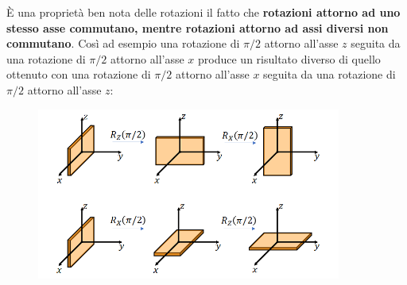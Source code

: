 \documentclass[a4paper,12pt,oneside]{book}
\begin{document}
È una proprietà ben nota delle rotazioni il fatto che \textbf{rotazioni attorno ad uno stesso asse commutano, mentre rotazioni attorno ad assi diversi non commutano}. Così ad esempio una rotazione di $\pi /2$ attorno all'asse $z$ seguita da una rotazione di $\pi /2$ attorno all'asse $x$ produce un risultato diverso di quello ottenuto con una rotazione di $\pi /2$ attorno all'asse $x$ seguita da una rotazione di $\pi /2$ attorno all'asse $z$:\\
\begin{figure}[!htbp]
\begin{center}
\includegraphics[width=10cm]{immagini/cap_16/fig_16_1.png}
\end{center}
\end{figure}
\end{document}
